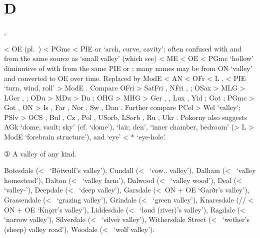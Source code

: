 \documentclass[12pt,letterpaper,oneside,article,draft]{memoir}
\begin{document}
\section*{D}

\begin{Lemma}
\begin{Also}
	, 
\end{Also}
\begin{Etymology}
	< OE  (pl.\ ) < PGmc  < PIE  or  ‘arch, curve, cavity’;
		often confused with and from the same source as  ‘small valley’ (which see) < ME 
		< OE  < PGmc  ‘hollow’ diminutive of  with  from the same
		PIE  or ; many names may be from ON  ‘valley’ and converted to
		OE  over time.
	Replaced by ModE  < AN  < OFr  < L , 
		< PIE  ‘turn, wind, roll’ > ModE .
	Compare
	OFri  > SatFri , NFri , ;
	OSax  > MLG  > LGer , ;
	ODu  > MDu  > Du ;
	OHG  > MHG  > Ger , , Lux , Yid  ;
	Got  ;
	PGmc  > Got  , ON  >
		Is , Far , Nor , Sw , Dan .
	Further compare
	PCel  > Wel  ‘valley’;
	PSlv  > OCS  , Bul  , Cz , Pol ,
		USorb, LSorb , Ru  , Ukr  .
	Pokorny also suggests
	AGk   ‘dome, vault; sky’ (cf.   ‘dome’),
		  ‘lair, den’, 
		  ‘inner chamber, bedroom’
			(> L  > ModE  ‘forebrain structure’),
		and   ‘eye’ < *  ‘eye-hole’.
\end{Etymology}
\begin{Definitions}
	① A valley of any kind.
\end{Definitions}
\begin{Examples}
	Botesdale (<~ ‘Bōtwulf’s valley’),
	Cundall (<~ ‘cow.. valley’),
	Dalham (<~ ‘valley homestead’),
	Dalton (<~ ‘valley farm’),
	Dalwood (<~ ‘valley wood’),
	Deal (<~ ‘valley-’),
	Deepdale (<~ ‘deep valley’),
	Garsdale (<~ON  + OE  ‘Garðr’s valley’),
	Grassendale (<~ ‘grazing valley’),
	Grindale (<~ ‘green valley’),
	Knaresdale (// < ON  + OE  ‘Knǫrr’s valley’),
	Liddesdale (<~ ‘loud (river)’s valley’),
	Ragdale (<~ ‘narrow valley’),
	Silverdale (<~ ‘silver valley’),
	Withersdale Street (<~ ‘wether’s (sheep) valley road’),
	Woodale (<~ ‘wolf valley’).
\end{Examples}
\end{Lemma}
\end{document}
